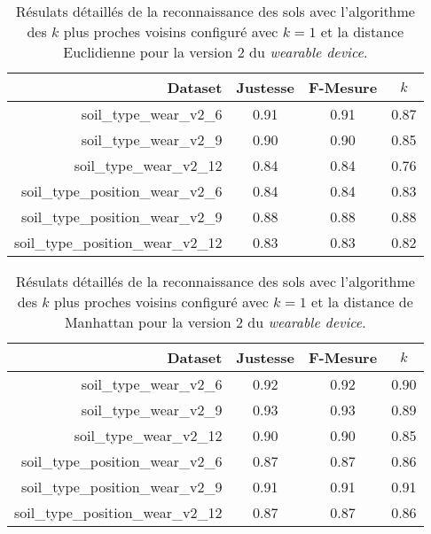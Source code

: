 \begin{table}[H]\renewcommand{\arraystretch}{0.5}
	\centering
	\caption{Résulats détaillés de la reconnaissance des sols avec l'algorithme des $k$ plus proches voisins configuré avec $k=1$ et la distance Euclidienne pour la version 2 du \textit{wearable device}.}
	\label{tab:tab:knn-dE-wear-v2}
	\begin{tabular}{@{}rccc@{}}
		\toprule
			\textbf{Dataset} & \textbf{Justesse} & \textbf{F-Mesure} & \textbf{$k$} \\
		\midrule
			soil\_type\_wear\_v2\_6 & 0.91 & 0.91 & 0.87 \\
			soil\_type\_wear\_v2\_9 & 0.90 & 0.90 & 0.85 \\
			soil\_type\_wear\_v2\_12 & 0.84 & 0.84 & 0.76 \\
			soil\_type\_position\_wear\_v2\_6 & 0.84 & 0.84 & 0.83 \\
			soil\_type\_position\_wear\_v2\_9 & 0.88 & 0.88 & 0.88 \\
			soil\_type\_position\_wear\_v2\_12 & 0.83 & 0.83 & 0.82 \\
		\bottomrule
	\end{tabular}
\end{table}

\begin{table}[H]\renewcommand{\arraystretch}{0.5}
	\centering
	\caption{Résulats détaillés de la reconnaissance des sols avec l'algorithme des $k$ plus proches voisins configuré avec $k=1$ et la distance de Manhattan pour la version 2 du \textit{wearable device}.}
	\label{tab:tab:knn-dM-wear-v2}
	\begin{tabular}{@{}rccc@{}}
		\toprule
			\textbf{Dataset} & \textbf{Justesse} & \textbf{F-Mesure} & \textbf{$k$} \\
		\midrule
			soil\_type\_wear\_v2\_6 & 0.92 & 0.92 & 0.90 \\
			soil\_type\_wear\_v2\_9 & 0.93 & 0.93 & 0.89 \\
			soil\_type\_wear\_v2\_12 & 0.90 & 0.90 & 0.85 \\
			soil\_type\_position\_wear\_v2\_6 & 0.87 & 0.87 & 0.86 \\
			soil\_type\_position\_wear\_v2\_9 & 0.91 & 0.91 & 0.91 \\
			soil\_type\_position\_wear\_v2\_12 & 0.87 & 0.87 & 0.86 \\
		\bottomrule
	\end{tabular}
\end{table}

